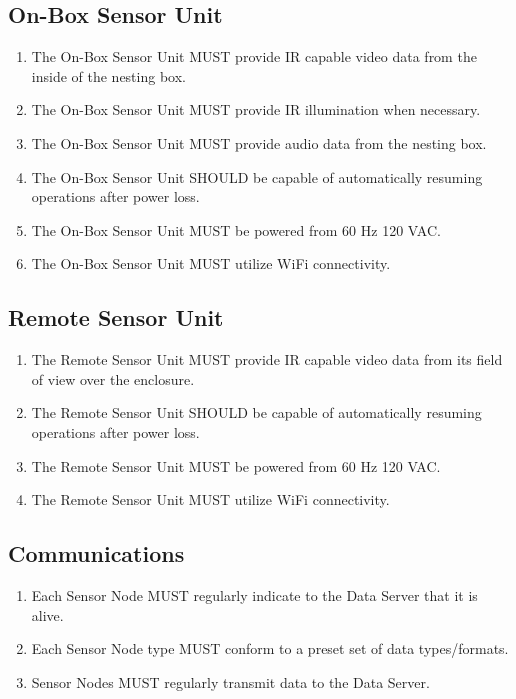 \documentclass{article}
\begin{document}
\subsection{On-Box Sensor Unit}
\begin{enumerate}
    \item The On-Box Sensor Unit MUST provide IR capable video data from the inside of the nesting box.
    \item The On-Box Sensor Unit MUST provide IR illumination when necessary.
    \item The On-Box Sensor Unit MUST provide audio data from the nesting box.
    \item The On-Box Sensor Unit SHOULD be capable of automatically resuming operations after power loss.
    \item The On-Box Sensor Unit MUST be powered from 60 Hz 120 VAC.
    \item The On-Box Sensor Unit MUST utilize WiFi connectivity.
\end{enumerate}

\subsection{Remote Sensor Unit}
\begin{enumerate}
    \item The Remote Sensor Unit MUST provide IR capable video data from its field of view over the enclosure.
    \item The Remote Sensor Unit SHOULD be capable of automatically resuming operations after power loss.
    \item The Remote Sensor Unit MUST be powered from 60 Hz 120 VAC.
    \item The Remote Sensor Unit MUST utilize WiFi connectivity.
\end{enumerate}

\subsection{Communications}
\begin{enumerate}
    \item Each Sensor Node MUST regularly indicate to the Data Server that it is alive.
    \item Each Sensor Node type MUST conform to a preset set of data types/formats.
    \item Sensor Nodes MUST regularly transmit data to the Data Server.
\end{enumerate}
\end{document}
